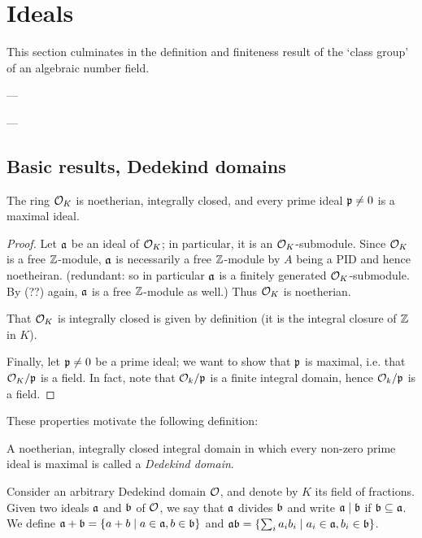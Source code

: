 \section{Ideals}

This section culminates in the definition and finiteness result of the `class group' of an algebraic number field.


---


---

\subsection{Basic results, Dedekind domains}

\begin{theorem}
	The ring $\mathcal{O}_K$ is noetherian, integrally closed, and every prime ideal $\mathfrak{p}\neq 0$ is a maximal ideal.
\end{theorem}
\begin{proof}
	Let $\mathfrak{a}$ be an ideal of $\mathcal{O}_K$; in particular, it is an $\mathcal{O}_K$-submodule. Since $\mathcal{O}_K$ is a free $\mathbb{Z}$-module, $\mathfrak{a}$ is necessarily a free $\mathbb{Z}$-module by $A$ being a PID and hence noetheiran. (redundant: so in particular $\mathfrak{a}$ is a finitely generated $\mathcal{O}_K$-submodule. By (??) again, $\mathfrak{a}$ is a free $\mathbb{Z}$-module as well.) Thus $\mathcal{O}_K$ is noetherian.
	
	That $\mathcal{O}_K$ is integrally closed is given by definition (it is the integral closure of $\mathbb{Z}$ in $K$).

	Finally, let $\mathfrak{p}\neq 0$ be a prime ideal; we want to show that $\mathfrak{p}$ is maximal, i.e. that $\mathcal{O}_K/\mathfrak{p}$ is a field. In fact, note that $\mathcal{O}_k/\mathfrak{p}$ is a finite integral domain, hence $\mathcal{O}_k/\mathfrak{p}$ is a field.
\end{proof}


These properties motivate the following definition:

\begin{definition}
	A noetherian, integrally closed integral domain in which every non-zero prime ideal is maximal is called a \emph{Dedekind domain}.
\end{definition}

Consider an arbitrary Dedekind domain $\mathcal{O}$, and denote by $K$ its field of fractions. Given two ideals $\mathfrak{a}$ and $\mathfrak{b}$ of $\mathcal{O}$, we say that $\mathfrak{a}$ divides $\mathfrak{b}$ and write $\mathfrak{a}\mid\mathfrak{b}$ if $\mathfrak{b}\subseteq\mathfrak{a}$. We define $\mathfrak{a}+\mathfrak{b}=\{a+b\mid a\in\mathfrak{a}, b\in\mathfrak{b}\}$ and $\mathfrak{a}\mathfrak{b} = \{\sum_i a_ib_i \mid a_i\in\mathfrak{a}, b_i\in\mathfrak{b}\}$.

